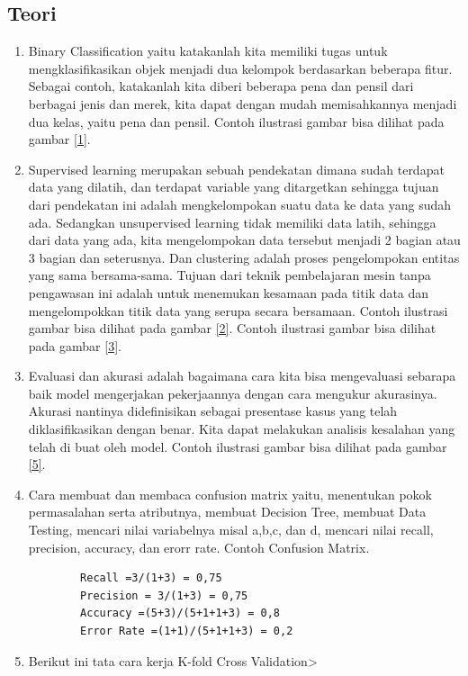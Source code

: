 \subsection{Teori}
\begin{enumerate}
\item Binary Classification yaitu katakanlah kita memiliki tugas untuk mengklasifikasikan objek menjadi dua kelompok berdasarkan beberapa fitur. Sebagai contoh, katakanlah kita diberi beberapa pena dan pensil dari berbagai jenis dan merek, kita dapat dengan mudah memisahkannya menjadi dua kelas, yaitu pena dan pensil.
\subitem Contoh ilustrasi gambar bisa dilihat pada gambar \ref{1}.

\item Supervised learning merupakan sebuah pendekatan dimana sudah terdapat data yang dilatih, dan terdapat variable yang ditargetkan sehingga tujuan dari pendekatan ini adalah mengkelompokan suatu data ke data yang sudah ada. Sedangkan unsupervised learning tidak memiliki data latih, sehingga dari data yang ada, kita mengelompokan data tersebut menjadi 2 bagian atau 3 bagian dan seterusnya. Dan clustering adalah proses pengelompokan entitas yang sama bersama-sama. Tujuan dari teknik pembelajaran mesin tanpa pengawasan ini adalah untuk menemukan kesamaan pada titik data dan mengelompokkan titik data yang serupa secara bersamaan\cite{zhu2009introduction}.
\subitem Contoh ilustrasi gambar bisa dilihat pada gambar \ref{2}.
\subitem Contoh ilustrasi gambar bisa dilihat  pada gambar \ref{3}.
\item Evaluasi dan akurasi adalah bagaimana cara kita bisa mengevaluasi sebarapa baik model mengerjakan pekerjaannya dengan cara mengukur akurasinya. Akurasi nantinya didefinisikan sebagai presentase kasus yang telah diklasifikasikan dengan benar. Kita dapat melakukan analisis kesalahan yang telah di buat oleh model.
\subitem Contoh ilustrasi gambar bisa dilihat pada gambar \ref{5}.
\item Cara membuat dan membaca confusion matrix yaitu, menentukan pokok permasalahan serta atributnya, membuat Decision Tree, membuat Data Testing, mencari nilai variabelnya misal a,b,c, dan d, mencari nilai recall, precision, accuracy, dan erorr rate.
\subitem Contoh Confusion Matrix.
\begin{verbatim}
		Recall =3/(1+3) = 0,75
		Precision = 3/(1+3) = 0,75
		Accuracy =(5+3)/(5+1+1+3) = 0,8
		Error Rate =(1+1)/(5+1+1+3) = 0,2 
\end{verbatim}
\item Berikut ini tata cara kerja K-fold Cross Validation>

\end{enumerate}
